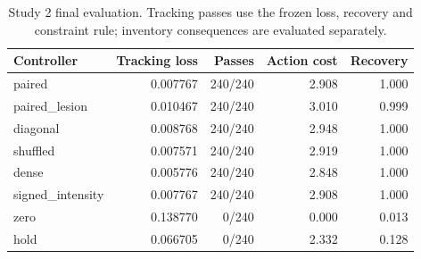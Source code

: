 \begin{table}[htbp]
\centering\small
\begin{tabular}{lrrrr}
\toprule
Controller & Tracking loss & Passes & Action cost & Recovery \\
\midrule
paired & 0.007767 & 240/240 & 2.908 & 1.000 \\
paired\_lesion & 0.010467 & 240/240 & 3.010 & 0.999 \\
diagonal & 0.008768 & 240/240 & 2.948 & 1.000 \\
shuffled & 0.007571 & 240/240 & 2.919 & 1.000 \\
dense & 0.005776 & 240/240 & 2.848 & 1.000 \\
signed\_intensity & 0.007767 & 240/240 & 2.908 & 1.000 \\
zero & 0.138770 & 0/240 & 0.000 & 0.013 \\
hold & 0.066705 & 0/240 & 2.332 & 0.128 \\
\bottomrule
\end{tabular}
\caption{Study 2 final evaluation. Tracking passes use the frozen loss, recovery and constraint rule; inventory consequences are evaluated separately.}
\label{tab:study2}
\end{table}
